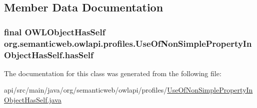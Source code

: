 \subsection{Member Data Documentation}
\hypertarget{classorg_1_1semanticweb_1_1owlapi_1_1profiles_1_1_use_of_non_simple_property_in_object_has_self_afcc32affa07cbcef857ca613dd3fb096}{
\subsubsection[{has\-Self}]{\setlength{\rightskip}{0pt plus 5cm}final {\bf O\-W\-L\-Object\-Has\-Self} org.\-semanticweb.\-owlapi.\-profiles.\-Use\-Of\-Non\-Simple\-Property\-In\-Object\-Has\-Self.\-has\-Self\hspace{0.3cm}{\ttfamily [private]}}}\label{classorg_1_1semanticweb_1_1owlapi_1_1profiles_1_1_use_of_non_simple_property_in_object_has_self_afcc32affa07cbcef857ca613dd3fb096}


The documentation for this class was generated from the following file\-:\begin{DoxyCompactItemize}
\item 
api/src/main/java/org/semanticweb/owlapi/profiles/\hyperlink{_use_of_non_simple_property_in_object_has_self_8java}{Use\-Of\-Non\-Simple\-Property\-In\-Object\-Has\-Self.\-java}\end{DoxyCompactItemize}
